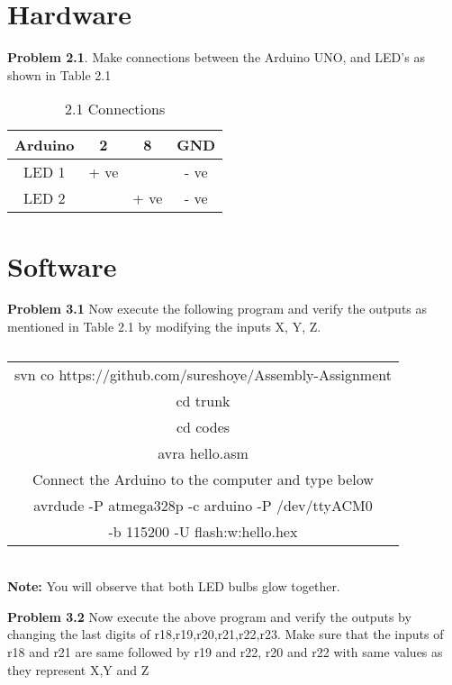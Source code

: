 \documentclass[journal,12pt,twocolumn]{IEEEtran}
\begin{document}
\section{Hardware}


\textbf{Problem 2.1}. Make connections between the Arduino UNO, and LED's as shown in Table 2.1 \\


\begin{table}[h]
    \centering
    \begin{tabular}{| c | c | c | c |}
        \hline
         Arduino & 2 & 8 & GND  \\
       \hline
       LED 1 & + ve &  & - ve  \\
        \hline
      LED 2 &  & + ve & - ve  \\
        \hline
         
         \hline
    \end{tabular}
    \caption{2.1 Connections}
\end{table}

\section{Software}

\textbf{Problem 3.1} Now execute the following program and verify the outputs as mentioned in Table 2.1 by modifying the inputs X, Y, Z.\\
\begin{table}[h]
    \centering
    \begin{tabular}{| c |}
    \hline
    svn co https://github.com/sureshoye/Assembly-Assignment\\
    	cd trunk \\

	cd codes \\
	
	avra hello.asm \\

	Connect the Arduino to the computer and type below\\

	avrdude -P atmega328p -c arduino -P /dev/ttyACM0 \\-b 115200 -U flash:w:hello.hex\\
    
    \hline
    \end{tabular}
    \caption{}
    \label{}
 \end{table}
 \\
\textbf{Note:} You will observe that both LED bulbs glow together.

\textbf{Problem 3.2} Now execute the above program and verify the outputs by changing the last digits of r18,r19,r20,r21,r22,r23. Make sure that the inputs of r18 and r21 are same followed by r19 and r22, r20 and r22 with same values as they represent X,Y and Z \\
\end{document}
